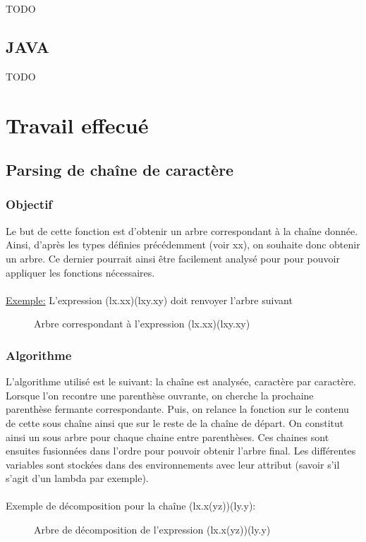 \documentclass[a4paper,11pt,titlepage]{article}
\begin{document}
TODO

\subsection{JAVA}

TODO

\newpage
\section{Travail effecué}

\subsection{Parsing de chaîne de caractère}

\subsubsection{Objectif}
Le but de cette fonction est d'obtenir un arbre correspondant à la chaîne donnée. Ainsi, d'après les types définies précédemment (voir xx), on souhaite donc obtenir un arbre. Ce dernier pourrait ainsi être facilement analysé pour pour pouvoir appliquer les fonctions nécessaires.
\\
\\\underline{Exemple:} L'expression (lx.xx)(lxy.xy) doit renvoyer l'arbre suivant
\begin{figure}[H]
\centering
  {
	 {{
		 {
			  {
			   {}
			   {}
			  }
		 }
	 }
	{
		 {
			  {
			   {{}
			   {}}
			  }
		 }
	}}
  }
\caption{Arbre correspondant à l'expression (lx.xx)(lxy.xy)}
 \label{tree1}
\end{figure}

\subsubsection{Algorithme}
L'algorithme utilisé est le suivant: la chaîne est analysée, caractère par caractère. Lorsque l'on recontre une parenthèse ouvrante, on cherche la prochaine parenthèse fermante correspondante. Puis, on relance la fonction sur le contenu de cette sous chaîne ainsi que sur le reste de la chaîne de départ. On constitut ainsi un sous arbre pour chaque chaine entre parenthèses. Ces chaines sont ensuites fusionnées dans l'ordre pour pouvoir obtenir l'arbre final.
Les différentes variables sont stockées dans des environnements avec leur attribut (savoir s'il s'agit d'un lambda par exemple).
\\
\\Exemple de décomposition pour la chaîne (lx.x(yz))(ly.y):
\begin{figure}[H]
\centering
  {
	 {{
			  {
			   {}
			   {}
			  }
		 
	 }
	{}
	}
  }
\caption{Arbre de décomposition de l'expression (lx.x(yz))(ly.y)}
 \label{tree2}
\end{figure}
\end{document}
